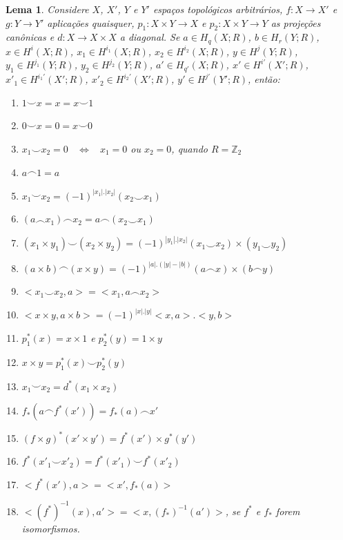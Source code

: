 \documentclass[12pt,oneside]{book} %
\newtheorem{lem}    {\hspace{0.5cm}Lema}[chapter]
\newcommand{\Z}{\mathbb{Z}}
\newcommand{\ccup}{\smile}
\newcommand{\ccap}{\frown}
\begin{document}
\begin{lem}\label{propriedades_produtos}
	Considere $X$, $X'$, $Y$ e $Y'$ espaços topológicos arbitrários, $f:X\to X'$ e $g:Y\to Y'$ aplicações quaisquer, $p_{1}:X\times Y\to X$ e $p_{2}:X\times Y\to Y$ as projeções canônicas e $d:X\to X\times X$ a diagonal. Se $a\in H_{q}(X;R)$, $b\in H_{r}(Y;R)$, $x\in H^{i}(X;R)$, $x_{1}\in H^{i_{1}}(X;R)$, $x_{2}\in H^{i_{2}}(X;R)$, $y\in H^{j}(Y;R)$, $y_{1}\in H^{j_{1}}(Y;R)$, $y_{2}\in H^{j_{2}}(Y;R)$, $a'\in H_{q'}(X;R)$, $x'\in H^{i'}(X';R)$, $x'_{1}\in H^{i_{1}'}(X';R)$, $x'_{2}\in H^{i_{2}'}(X';R)$, $y'\in H^{j'}(Y';R)$, então:
	
	\begin{enumerate}
		\item $1\ccup x=x=x\ccup 1$
		\item $0\ccup x=0=x\ccup 0$
		\item $x_{1}\ccup x_{2}=0$ \  $\Longleftrightarrow$ \ $x_{1}=0$ ou $x_{2}=0$, quando $R=\Z_{2}$
		\item $a\ccap 1=a$
		\item $x_{1}\ccup x_{2}=(-1)^{|x_{1}|.|x_{2}|}(x_{2}\ccup x_{1})$
		\item $(a\ccap x_{1})\ccap x_{2}=a\ccap (x_{2}\ccup x_{1})$
		\item $(x_{1}\times y_{1})\ccup (x_{2}\times y_{2})=(-1)^{|y_{1}|.|x_{2}|}(x_{1}\ccup x_{2})\times (y_{1}\ccup y_{2})$
		\item $(a\times b)\ccap (x\times y)=(-1)^{|a|.(|y|-|b|)}(a\ccap x)\times (b\ccap y)$
		\item $<x_{1}\ccup x_{2},a>=<x_{1},a\ccap x_{2}>$
		\item $<x\times y,a\times b>=(-1)^{|x|.|y|}<x,a>.<y,b>$
		\item $p_{1}^{*}(x)=x\times 1$ e $p_{2}^{*}(y)=1\times y$
		\item $x\times y=p_{1}^{*}(x)\ccup p_{2}^{*}(y)$
		\item $x_{1}\ccup x_{2}=d^{*}(x_{1}\times x_{2})$
		\item $f_{*}(a\ccap f^{*}(x'))=f_{*}(a)\ccap x'$
		\item $(f\times g)^{*}(x'\times y')=f^{*}(x')\times g^{*}(y')$
		\item $f^{*}(x'_{1}\ccup x'_{2})=f^{*}(x'_{1})\ccup f^{*}(x'_{2})$
		\item $<f^{*}(x'),a>=<x',f_{*}(a)>$
		\item $<(f^{*})^{-1}(x),a'>=<x,(f_{*})^{-1}(a')>$, se $f^{*}$ e $f_{*}$ forem isomorfismos.
	\end{enumerate} 
\end{lem}
\end{document}
